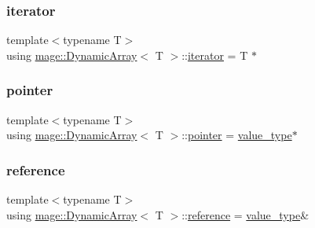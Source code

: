 \mbox{\label{classmage_1_1_dynamic_array_af49b03e8ab90f3f38f6fc735cef81baf}} 
\subsubsection{\texorpdfstring{iterator}{iterator}}
{\footnotesize\ttfamily template$<$typename T$>$ \\
using \mbox{\hyperlink{classmage_1_1_dynamic_array}{mage\+::\+Dynamic\+Array}}$<$ T $>$\+::\mbox{\hyperlink{classmage_1_1_dynamic_array_af49b03e8ab90f3f38f6fc735cef81baf}{iterator}} =  T $\ast$}

\mbox{\label{classmage_1_1_dynamic_array_a32797baab97829f4040b95383cdebf51}} 
\subsubsection{\texorpdfstring{pointer}{pointer}}
{\footnotesize\ttfamily template$<$typename T$>$ \\
using \mbox{\hyperlink{classmage_1_1_dynamic_array}{mage\+::\+Dynamic\+Array}}$<$ T $>$\+::\mbox{\hyperlink{classmage_1_1_dynamic_array_a32797baab97829f4040b95383cdebf51}{pointer}} =  \mbox{\hyperlink{classmage_1_1_dynamic_array_a1f26711f844168c39991df0d5a340178}{value\+\_\+type}}$\ast$}

\mbox{\label{classmage_1_1_dynamic_array_ac725ab843a578b8eb2e4499eca728149}} 
\subsubsection{\texorpdfstring{reference}{reference}}
{\footnotesize\ttfamily template$<$typename T$>$ \\
using \mbox{\hyperlink{classmage_1_1_dynamic_array}{mage\+::\+Dynamic\+Array}}$<$ T $>$\+::\mbox{\hyperlink{classmage_1_1_dynamic_array_ac725ab843a578b8eb2e4499eca728149}{reference}} =  \mbox{\hyperlink{classmage_1_1_dynamic_array_a1f26711f844168c39991df0d5a340178}{value\+\_\+type}}\&}

